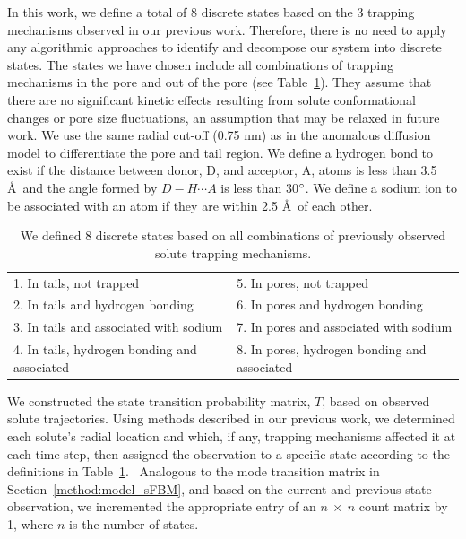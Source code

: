 \documentclass{article}
\begin{document}
  In this work, we define a total of 8 discrete states based on the 3 trapping
  mechanisms observed in our previous work. Therefore, there is no need to 
  apply any algorithmic approaches to identify and decompose our system into 
  discrete states. The states we have chosen include all combinations of trapping
  mechanisms in the pore and out of the pore (see Table~\ref{table:states}). They
  assume that there are no significant kinetic effects resulting from solute 
  conformational changes or pore size fluctuations, an assumption that may be 
  relaxed in future work. We use the same radial cut-off (0.75 nm) as in the 
  anomalous diffusion model to differentiate the pore and tail region.  We define 
  a hydrogen bond to exist if the distance between donor, D, and acceptor, A, 
  atoms is less than 3.5 \AA~and the angle formed by $D-H \cdots A$ is less than
  30$\degree$. We define a sodium ion to be associated with an atom if they are 
  within 2.5 \AA~of each other.~\cite{coscia_chemically_2019}
  
  \begin{table}[!htb]
	  \centering
	  \begin{tabular}{|l|l|}
	  \hline
	  1. In tails, not trapped                     & 5. In pores, not trapped                     \\
	  2. In tails and hydrogen bonding             & 6. In pores and hydrogen bonding             \\
	  3. In tails and associated with sodium       & 7. In pores and associated with sodium       \\
	  4. In tails, hydrogen bonding and associated & 8. In pores, hydrogen bonding and associated \\
	  \hline
	  \end{tabular}
	  \caption{We defined 8 discrete states based on all combinations of previously observed solute
	  trapping mechanisms.}\label{table:states}  
  \end{table}
  
  We constructed the state transition probability matrix, $T$, based on observed solute trajectories.
  Using methods described in our previous work, we determined each solute's radial location 
  and which, if any, trapping mechanisms affected it at each time step, then assigned the 
  observation to a specific state according to the definitions in Table~\ref{table:states}.~\cite{coscia_chemically_2019}
  Analogous to the mode transition matrix in Section~\ref{method:model_sFBM}, and based on
  the current and previous state observation, we incremented the appropriate entry of an
  $n~\times~n$ count matrix by 1, where $n$ is the number of states.
  
\end{document}
